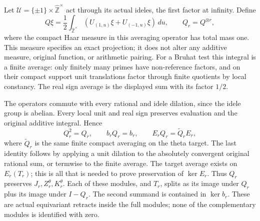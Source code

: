 Let $\mathcal U=\{\pm1\}\times\widehat{\mathbb Z}^{\times}$
act through its actual ideles, the first factor at infinity. Define
\begin{equation}\tag{GSB9}
Q\xi=\frac12\int_{\widehat{\mathbb Z}^{\times}}
       (U_{(1,u)}\xi+U_{(-1,u)}\xi)\,du,\qquad Q_r=Q^{\otimes r},
\end{equation}
where the compact Haar measure in this averaging operator has total
mass one. This measure specifies an exact projection; it does not
alter any additive measure, original function, or arithmetic pairing.
For a Bruhat test this integral is a finite average: only finitely
many primes have non-reference factors, and on their compact support
unit translations factor through finite quotients by local constancy.
The real sign average is the displayed sum with its factor $1/2$.

The operators commute with every rational and idele dilation, since
the idele group is abelian. Every local unit and real sign preserves
evaluation and the original additive integral. Hence
\begin{equation}\tag{GSB10}
Q_r^2=Q_r,\qquad b_rQ_r=b_r,\qquad
E_rQ_r=\widetilde Q_rE_r,
\end{equation}
where $\widetilde Q_r$ is the same finite compact averaging on the
theta target. The last identity follows by applying a unit dilation
to the absolutely convergent original rational sum, or termwise
to the finite average. The target average exists on $E_r(T_r)$;
this is all that is needed to prove preservation of $\ker E_r$.
Thus $Q_r$ preserves $J_r,Z_r^\theta,K_r^\theta$. Each of these
modules, and $T_r$, splits as its image under $Q_r$ plus its image
under $I-Q_r$. The second summand is contained in $\ker b_r$.
These are actual equivariant retracts inside the full modules;
none of the complementary modules is identified with zero.

